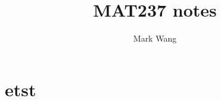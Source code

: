 \documentclass[11pt]{article}
\title{MAT237 notes}
\author{Mark Wang}
\begin{document}
\maketitle
\tableofcontents






\section{etst}
\end{document}
